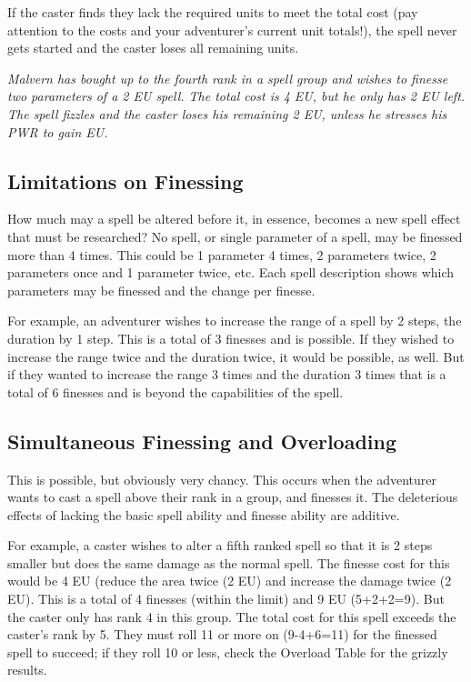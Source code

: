 \begin{multicols*}{2}
If the caster finds they lack the required units to meet the total cost (pay attention to the costs and your adventurer’s current unit totals!), the spell never gets started and the caster loses all remaining units.

\textit{Malvern has bought up to the fourth rank in a spell group and wishes to finesse two parameters of a 2 EU spell. The total cost is 4 EU, but he only has 2 EU left. The spell fizzles and the caster loses his remaining 2 EU, unless he stresses his PWR to gain EU.}
\subsection{Limitations on Finessing}
How much may a spell be altered before it, in essence, becomes a new spell effect that must be researched? No spell, or single parameter of a spell, may be finessed more
than 4 times. This could be 1 parameter 4 times, 2 parameters twice, 2 parameters once and 1 parameter twice, etc. Each spell description shows which parameters may be finessed and the change per finesse.

For example, an adventurer wishes to increase the range of a spell by 2 steps, the duration by 1 step. This is a total of 3 finesses and is possible. If they wished to increase the range twice and the duration twice, it would be possible, as well. But if they wanted to increase the range 3 times and the duration 3 times that is a total of 6 finesses and is beyond the capabilities of the spell.
\subsection{Simultaneous Finessing and Overloading}
This is possible, but obviously very chancy. This occurs when the adventurer wants to cast a spell above their rank in a group, and finesses it. The deleterious effects of lacking the basic spell ability and finesse ability are additive.

For example, a caster wishes to alter a fifth ranked spell so that it is 2 steps smaller but does the same damage as the normal spell. The finesse cost for this would be 4 EU (reduce the area twice (2 EU) and increase the damage twice (2 EU). This is a total of 4 finesses (within the limit) and 9 EU (5+2+2=9). But the caster only has rank 4 in this group. The total cost for this spell exceeds the caster’s rank by 5. They must roll 11 or more on  (9-4+6=11) for the finessed spell to succeed; if they roll 10 or less, check the Overload Table for the grizzly results.

\end{multicols*}
